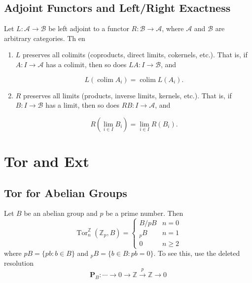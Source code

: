 \documentclass[12pt, oneside]{book}
\begin{document}
\section{Adjoint Functors and Left/Right Exactness}
\begin{theorem}
    Let $L: \mathcal{A} \rightarrow \mathcal{B}$ be left adjoint to a functor $R: \mathcal{B} \rightarrow \mathcal{A}$, where $\mathcal{A}$ and $\mathcal{B}$ are arbitrary categories. Th
    en
    \begin{enumerate}
        \item
              $L$ preserves all colimits (coproducts, direct limits, cokernels, etc.). That is, if $A: I \rightarrow \mathcal{A}$ has a colimit, then so does $L A: I \rightarrow \mathcal{B}$, and

              \begin{equation*}
                  L\left(\operatorname{colim} A_i\right)=\operatorname{colim} L\left(A_i\right) .
              \end{equation*}

        \item
              $R$ preserves all limits (products, inverse limits, kernels, etc.). That is, if $B: I \rightarrow \mathcal{B}$ has a limit, then so does $R B: I \rightarrow \mathcal{A}$, and

              \begin{equation*}
                  R\left(\lim _{i \in I} B_i\right)=\lim _{i \in I} R\left(B_i\right) .
              \end{equation*}
    \end{enumerate}
\end{theorem}


\chapter{Tor and Ext}
\section{Tor for Abelian Groups}

\begin{example}
    Let $B$ be an abelian group and $p$ be a prime number.
    Then
    \begin{equation*}
        \operatorname{Tor}_n^{\mathbb{Z}}(\mathbb{Z}_p, B)
        =
        \begin{cases}
            B / pB  & n=0      \\
            { }_p B & n=1      \\
            0       & n \geq 2
        \end{cases}
    \end{equation*}
    where $pB=\{pb : b \in B\}$ and ${ }_p B=\{b \in B : p b=0\}$.
    To see this, use the deleted resolution
    \begin{equation*}
        \mathbf{P}_B: \cdots \rightarrow0 \rightarrow \mathbb{Z} \xrightarrow{p} \mathbb{Z}  \rightarrow 0
    \end{equation*}
\end{example}
\end{document}
